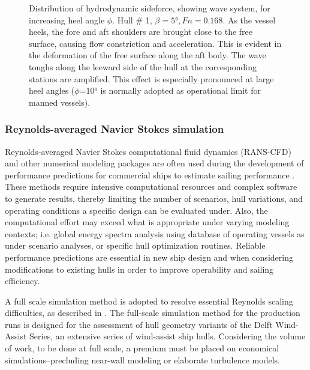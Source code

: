 \documentclass[twoside,twocolumn]{article}
\begin{document}
\begin{figure}[!h]
	\caption{Distribution of hydrodynamic sideforce, showing wave system, for increasing heel angle $\phi$.  Hull \# 1, $\beta=\ang{5}, Fn=0.168$. As the vessel heels, the fore and aft shoulders are brought close to the free surface, causing flow constriction and acceleration. This is evident in the deformation of the free surface along the aft body. The wave toughs along the leeward side of the hull at the corresponding stations are amplified. This effect is especially pronounced at large heel angles ($\phi$=\ang{10} is normally adopted as operational limit for manned vessels).}
	\label{fig:Ynphi}
\end{figure}

\subsubsection{Reynolds-averaged Navier Stokes simulation}

Reynolds-averaged Navier Stokes computational fluid dynamics (RANS-CFD) and other numerical modeling packages are often used during the development of performance predictions for commercial ships to estimate sailing performance \citep{Tezdogan2015,Eggers16,Kolk18c}. These methods require intensive computational resources and complex software to generate results, thereby limiting the number of scenarios, hull variations, and operating conditions a specific design can be evaluated under. Also, the computational effort may exceed what is appropriate under varying modeling contexts; i.e. global energy spectra analysis using database of operating vessels as under scenario analyses, or specific hull optimization routines. Reliable performance predictions are essential in new ship design and when considering modifications to existing hulls in order to improve operability and sailing efficiency. 

A full scale simulation method is adopted to resolve essential Reynolds scaling difficulties, as described in \cite{Kolk19d}. The full-scale simulation method for the production runs is designed for the assessment of hull geometry variants of the Delft Wind-Assist Series, an extensive series of wind-assist ship hulls. Considering the volume of work, to be done at full scale, a premium must be placed on economical simulations--precluding near-wall modeling or elaborate turbulence models.
\end{document}
